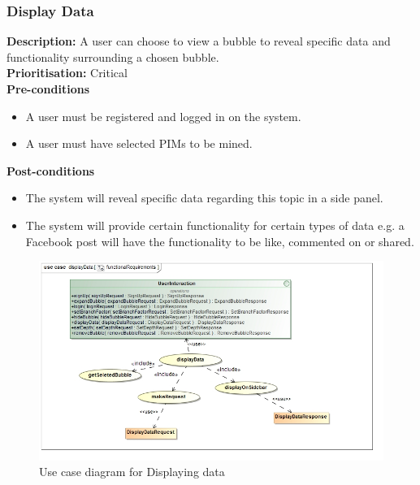 \documentclass[hidelinks,english]{article}
\begin{document}
    		\subsubsection{Display Data}
				\textbf{Description:}  A user can choose to view a bubble to reveal specific data and functionality surrounding a chosen bubble.\\
			    \textbf{Prioritisation:} Critical\\
			    \textbf{Pre-conditions}
			    \begin{itemize}
			        \item A user must be registered and logged in on the system.
			        \item A user must have selected PIMs to be mined.
			    \end{itemize}
				\textbf{Post-conditions}
				\begin{itemize}
					\item The system will reveal specific data regarding this topic in a side panel.
					\item The system will provide certain functionality for certain types of data e.g. a Facebook post will have the functionality to be like, commented on or shared.
				\end{itemize}
				
			\begin{figure}[!h]
    			\includegraphics[width=\linewidth]{functionalRequirementsDisplayData.jpg}
    			\caption{Use case diagram for Displaying data}
    			\label{UseCaseDisplayData}
    			\end{figure}
    			
\end{document}
